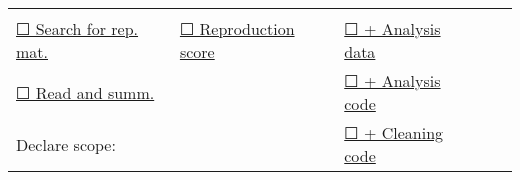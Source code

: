 \documentclass[]{book}
\begin{document}
\begin{longtable}[]{@{}lllll@{}}
\begin{minipage}[t]{0.06\columnwidth}
\strut
\end{minipage}\tabularnewline
\begin{minipage}[t]{0.28\columnwidth}\raggedright
\protect\hyperlink{verify-rep-mat}{☐ Search for rep. mat.}\strut
\end{minipage} & \begin{minipage}[t]{0.27\columnwidth}\raggedright
\protect\hyperlink{score}{☐ Reproduction score}\strut
\end{minipage} & \begin{minipage}[t]{0.19\columnwidth}\raggedright
\protect\hyperlink{ad}{☐ + Analysis data}\strut
\end{minipage} & \begin{minipage}[t]{0.07\columnwidth}\raggedright
\strut
\end{minipage} & \begin{minipage}[t]{0.06\columnwidth}\raggedright
\strut
\end{minipage}\tabularnewline
\begin{minipage}[t]{0.28\columnwidth}\raggedright
\protect\hyperlink{read-summ}{☐ Read and summ.}\strut
\end{minipage} & \begin{minipage}[t]{0.27\columnwidth}\raggedright
\strut
\end{minipage} & \begin{minipage}[t]{0.19\columnwidth}\raggedright
\protect\hyperlink{ac}{☐ + Analysis code}\strut
\end{minipage} & \begin{minipage}[t]{0.07\columnwidth}\raggedright
\strut
\end{minipage} & \begin{minipage}[t]{0.06\columnwidth}\raggedright
\strut
\end{minipage}\tabularnewline
\begin{minipage}[t]{0.28\columnwidth}\raggedright
Declare scope:\strut
\end{minipage} & \begin{minipage}[t]{0.27\columnwidth}\raggedright
\strut
\end{minipage} & \begin{minipage}[t]{0.19\columnwidth}\raggedright
\protect\hyperlink{cc}{☐ + Cleaning code}\strut
\end{minipage} & \begin{minipage}[t]{0.07\columnwidth}\raggedright
\strut
\end{minipage} & \begin{minipage}[t]{0.06\columnwidth}\raggedright

\end{minipage}
\end{longtable}
\end{document}
